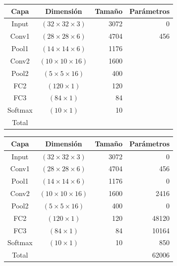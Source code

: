 \begin{frame}
    \centering
    \begin{tabular}{ccrr}
    \toprule
    \textbf{Capa}  & \textbf{Dimensión} & \textbf{Tamaño} & \textbf{Parámetros} \\ 
    \midrule
    Input   & $(32 \times 32 \times 3)$   & 3072   & 0        \\
    Conv1   & $(28 \times 28 \times 6)$   & 4704   & 456      \\ 
    Pool1   & $(14 \times 14 \times 6)$   & 1176   &         \\ 
    Conv2   & $(10 \times 10 \times 16)$  & 1600   &     \\ 
    Pool2   & $(5 \times 5 \times 16)$    & 400     &         \\ 
    FC2     & $(120 \times 1)$       & 120     &    \\ 
    FC3     & $(84 \times 1)$        & 84      &    \\ 
    Softmax & $(10 \times 1)$        & 10      &       \\ 
    \midrule
    Total &&&\\
    \bottomrule
    \end{tabular}

\end{frame}

\begin{frame}
    \centering
    \begin{tabular}{ccrr}
    \toprule
    \textbf{Capa}  & \textbf{Dimensión} & \textbf{Tamaño} & \textbf{Parámetros} \\ 
    \midrule
    Input   & $(32 \times 32 \times 3)$   & 3072   & 0        \\
    Conv1   & $(28 \times 28 \times 6)$   & 4704   & 456      \\ 
    Pool1   & $(14 \times 14 \times 6)$   & 1176   & 0        \\ 
    Conv2   & $(10 \times 10 \times 16)$  & 1600   & 2416    \\ 
    Pool2   & $(5 \times 5 \times 16)$    & 400     & 0        \\ 
    FC2     & $(120 \times 1)$       & 120     & 48120   \\ 
    FC3     & $(84 \times 1)$        & 84      & 10164   \\ 
    Softmax & $(10 \times 1)$        & 10      & 850      \\ 
    \midrule
    Total &&&62006\\
    \bottomrule
    \end{tabular}

\end{frame}
